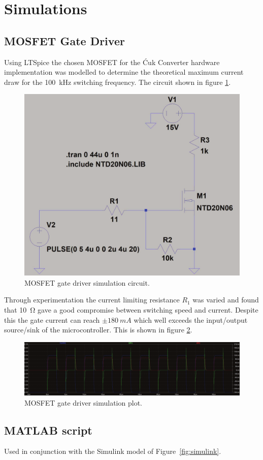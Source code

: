 \section{Simulations}
\subsection{MOSFET Gate Driver} \label{apx:sim_mosfet}
Using LTSpice the chosen MOSFET for the \'Cuk Converter hardware implementation was modelled to determine the theoretical maximum current draw for the \SI{100}{kHz} switching frequency. The circuit shown in figure \ref{fig:sim_mosfet_circuit}.
\begin{figure}[H]
    \centering
    \includegraphics[width = \textwidth]{figures/appendix/sim_mosfet_gate.pdf}
    \caption{MOSFET gate driver simulation circuit.}
    \label{fig:sim_mosfet_circuit}
\end{figure}
Through experimentation the current limiting resistance $R_1$ was varied and found that \SI{10}{\ohm} gave a good compromise between switching speed and current. Despite this the gate current can reach $\pm\SI{180}{mA}$ which well exceeds the input/output source/sink of the microcontroller. This is shown in figure \ref{fig:sim_mosfet_plot}.
\begin{figure}[H]
    \centering
    \includegraphics[width = \textwidth]{figures/appendix/sim_mosfet_gate_plot.pdf}
    \caption{MOSFET gate driver simulation plot.}
    \label{fig:sim_mosfet_plot}
\end{figure}
\subsection{\textsf{MATLAB} script}\label{apx:MATLAB}
Used in conjunction with the \textsf{Simulink} model of Figure~\ref{fig:simulink}.

